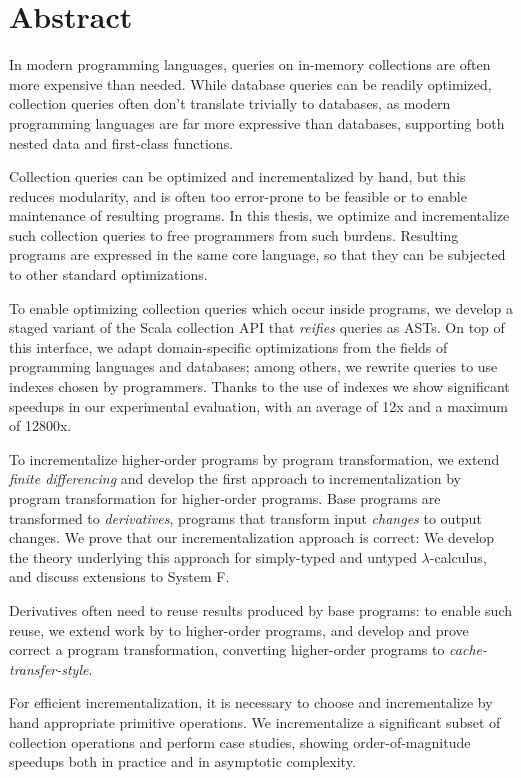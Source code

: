\chapter{Abstract}

In modern programming languages, queries on in-memory collections are often more
expensive than needed.
While database queries can be readily optimized, collection queries often don't
translate trivially to databases, as modern programming languages are far more
expressive than databases, supporting both nested data and first-class functions.

Collection queries can be optimized and incrementalized by hand, but this
reduces modularity, and is often too error-prone to be feasible or to enable
maintenance of resulting programs.
In this thesis, we optimize and incrementalize such collection queries to free
programmers from such burdens.
Resulting programs are expressed in the same core language, so that they can be
subjected to other standard optimizations.

To enable optimizing collection queries which occur inside programs, we develop a
staged variant of the Scala collection API that \emph{reifies} queries as ASTs.
On top of this interface, we adapt domain-specific optimizations from the fields
of programming languages and databases; among others, we rewrite queries to use
indexes chosen by programmers. Thanks to the use of indexes we show significant
speedups in our experimental evaluation, with an average of 12x and a maximum of
12800x.

To incrementalize higher-order programs by program transformation, we extend
\emph{finite differencing} \citep{Paige82FDC,Blakeley:1986:EUM,Gupta99MMV} and
develop the first approach to incrementalization by program transformation for
higher-order programs. Base programs are transformed to \emph{derivatives},
programs that transform input \emph{changes} to output changes.
We prove that our incrementalization approach is correct: We develop the theory
underlying this approach for simply-typed and untyped $\lambda$-calculus, and
discuss extensions to System F\@.

Derivatives often need to reuse results produced by base programs: to enable
such reuse, we extend work by \citet{Liu95} to higher-order programs, and
develop and prove correct a program transformation, converting higher-order
programs to \emph{cache-transfer-style}.

For efficient incrementalization, it is necessary to choose and incrementalize
by hand appropriate primitive operations. We incrementalize a significant subset
of collection operations and perform case studies, showing order-of-magnitude speedups
both in practice and in asymptotic complexity.

